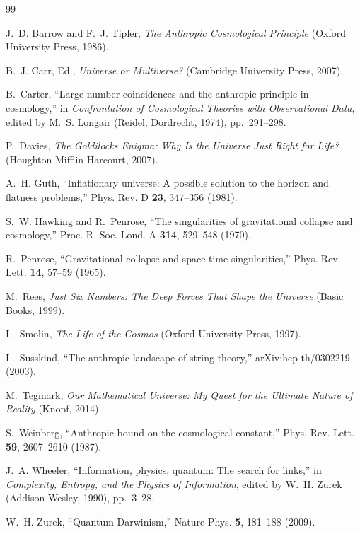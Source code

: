 \documentclass[12pt,a4paper]{article}
\theoremstyle{definition}
\theoremstyle{remark}
\begin{document}
\begin{thebibliography}{99}

J.~D. Barrow and F.~J. Tipler, \emph{The Anthropic Cosmological Principle} (Oxford University Press, 1986).

B.~J. Carr, Ed., \emph{Universe or Multiverse?} (Cambridge University Press, 2007).

B.~Carter, ``Large number coincidences and the anthropic principle in cosmology,'' in \emph{Confrontation of Cosmological Theories with Observational Data}, edited by M.~S. Longair (Reidel, Dordrecht, 1974), pp.~291--298.

P.~Davies, \emph{The Goldilocks Enigma: Why Is the Universe Just Right for Life?} (Houghton Mifflin Harcourt, 2007).

A.~H. Guth, ``Inflationary universe: A possible solution to the horizon and flatness problems,'' Phys. Rev. D \textbf{23}, 347--356 (1981).

S.~W. Hawking and R.~Penrose, ``The singularities of gravitational collapse and cosmology,'' Proc. R. Soc. Lond. A \textbf{314}, 529--548 (1970).

R.~Penrose, ``Gravitational collapse and space-time singularities,'' Phys. Rev. Lett. \textbf{14}, 57--59 (1965).

M.~Rees, \emph{Just Six Numbers: The Deep Forces That Shape the Universe} (Basic Books, 1999).

L.~Smolin, \emph{The Life of the Cosmos} (Oxford University Press, 1997).

L.~Susskind, ``The anthropic landscape of string theory,'' arXiv:hep-th/0302219 (2003).

M.~Tegmark, \emph{Our Mathematical Universe: My Quest for the Ultimate Nature of Reality} (Knopf, 2014).

S.~Weinberg, ``Anthropic bound on the cosmological constant,'' Phys. Rev. Lett. \textbf{59}, 2607--2610 (1987).

J.~A. Wheeler, ``Information, physics, quantum: The search for links,'' in \emph{Complexity, Entropy, and the Physics of Information}, edited by W.~H. Zurek (Addison-Wesley, 1990), pp.~3--28.

W.~H. Zurek, ``Quantum Darwinism,'' Nature Phys. \textbf{5}, 181--188 (2009).

\end{thebibliography}
\end{document}
